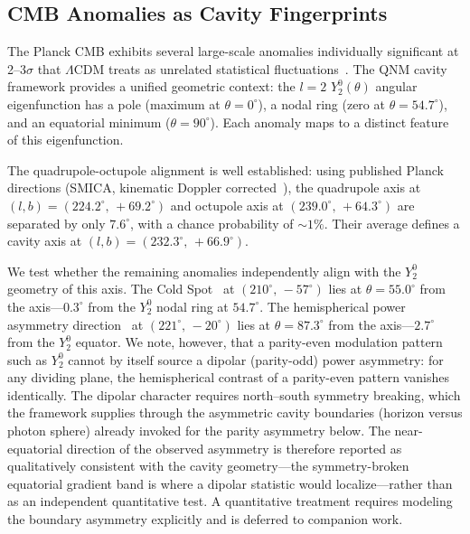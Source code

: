 \documentclass[aps,prd,twocolumn,superscriptaddress,showpacs,preprintnumbers,amsmath,amssymb,nofootinbib]{revtex4-2}
\newcommand{\lcdm}{$\Lambda$CDM}
\begin{document}
\subsection{CMB Anomalies as Cavity Fingerprints}
\label{sec:anomalies}

The Planck CMB exhibits several large-scale anomalies individually significant at 2--3$\sigma$ that \lcdm{} treats as unrelated statistical fluctuations~\cite{Planck2020}. The QNM cavity framework provides a unified geometric context: the $l = 2$ $Y_2^0(\theta)$ angular eigenfunction has a pole (maximum at $\theta = 0^{\circ}$), a nodal ring (zero at $\theta = 54.7^{\circ}$), and an equatorial minimum ($\theta = 90^{\circ}$). Each anomaly maps to a distinct feature of this eigenfunction.

The quadrupole-octupole alignment is well established: using published Planck directions (SMICA, kinematic Doppler corrected~\cite{deOliveiraCosta2004}), the quadrupole axis at $(l, b) = (224.2^{\circ},\, +69.2^{\circ})$ and octupole axis at $(239.0^{\circ},\, +64.3^{\circ})$ are separated by only $7.6^{\circ}$, with a chance probability of $\sim 1\%$. Their average defines a cavity axis at $(l, b) = (232.3^{\circ},\, +66.9^{\circ})$.

We test whether the remaining anomalies independently align with the $Y_2^0$ geometry of this axis. The Cold Spot~\cite{Vielva2004} at $(210^{\circ},\, -57^{\circ})$ lies at $\theta = 55.0^{\circ}$ from the axis---$0.3^{\circ}$ from the $Y_2^0$ nodal ring at $54.7^{\circ}$. The hemispherical power asymmetry direction~\cite{Planck2020} at $(221^{\circ},\, -20^{\circ})$ lies at $\theta = 87.3^{\circ}$ from the axis---$2.7^{\circ}$ from the $Y_2^0$ equator. We note, however, that a parity-even modulation pattern such as $Y_2^0$ cannot by itself source a dipolar (parity-odd) power asymmetry: for any dividing plane, the hemispherical contrast of a parity-even pattern vanishes identically. The dipolar character requires north--south symmetry breaking, which the framework supplies through the asymmetric cavity boundaries (horizon versus photon sphere) already invoked for the parity asymmetry below. The near-equatorial direction of the observed asymmetry is therefore reported as qualitatively consistent with the cavity geometry---the symmetry-broken equatorial gradient band is where a dipolar statistic would localize---rather than as an independent quantitative test. A quantitative treatment requires modeling the boundary asymmetry explicitly and is deferred to companion work.
\end{document}
